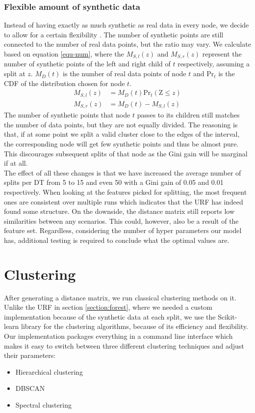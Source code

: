 \documentclass[conference]{IEEEtran}
\begin{document}
\subsubsection{Flexible amount of synthetic data}
Instead of having exactly as much synthetic as real data in every node, we decide to allow for a certain flexibility \cite{Kruber2019UnsupervisedAS}. The number of synthetic points are still connected to the number of real data points, but the ratio may vary. We calculate based on equation \ref{equ-num}, where the $M_{S,l}(z)$ and $M_{S,r}(z)$ represent the number of synthetic points of the left and right child of $t$ respectively, assuming a split at $z$. $M_D(t)$ is the number of real data points of node $t$ and $\textrm{Pr}_t$ is the CDF of the distribution chosen for node $t$.
\begin{equation}\label{equ-num}
\begin{split}
M_{S, l}(z) & = M_{D}(t) \textrm{Pr}_t(\textrm{Z} \leq z) \\
M_{S, r}(z) & = M_{D}(t) - M_{S, l}(z)
\end{split}
\end{equation}
The number of synthetic points that node $t$ passes to its children still matches the number of data points, but they are not equally divided. The reasoning is that, if at some point we split a valid cluster close to the edges of the interval, the corresponding node will get few synthetic points and thus be almost pure. This discourages subsequent splits of that node as the Gini gain will be marginal if at all.\\


The effect of all these changes is that we have increased the average number of splits per DT from 5 to 15 and even 50 with a Gini gain of 0.05 and 0.01 respectively. When looking at the features picked for splitting, the most frequent ones are consistent over multiple runs which indicates that the URF has indeed found some structure. On the downside, the distance matrix still reports low similarities between any scenarios. This could, however, also be a result of the feature set. Regardless, considering the number of hyper parameters our model has, additional testing is required to conclude what the optimal values are.

\section{Clustering}
\label{section:clustering}
After generating a distance matrix, we run classical clustering methods on it. Unlike the URF in section \ref{section:forest}, where we needed a custom implementation because of the synthetic data at each split, we use the Scikit-learn library \cite{sklearn_api} for the clustering algorithms, because of its efficiency and flexibility.  Our implementation packages everything in a command line interface which makes it easy to switch between three different clustering techniques and adjust their parameters:
\begin{itemize}
\item Hierarchical clustering
\item DBSCAN
\item Spectral clustering
\end{itemize}
\end{document}
